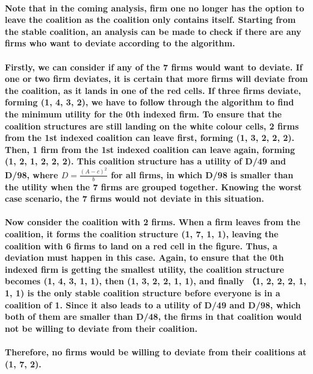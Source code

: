 \documentclass[11pt]{report}
\begin{document}
\paragraph{Note that in the coming analysis, firm one no longer has the option to leave the coalition as the coalition only contains itself. Starting from the stable coalition, an analysis can be made to check if there are any firms who want to deviate according to the algorithm.}

\paragraph{Firstly, we can consider if any of the 7 firms would want to deviate. If one or two firm deviates, it is certain that more firms will deviate from the coalition, as it lands in one of the red cells. If three firms deviate, forming (1, 4, 3, 2), we have to follow through the algorithm to find the minimum utility for the 0th indexed firm. To ensure that the coalition structures are still landing on the white colour cells, 2 firms from the 1st indexed coalition can leave first, forming (1, 3, 2, 2, 2). Then, 1 firm from the 1st indexed coalition can leave again, forming (1, 2, 1, 2, 2, 2). This coalition structure has a utility of D/49 and D/98, where $D=\frac{(A-c)^2}{b}$\cite{ray2007coalitionformation} for all firms, in which D/98 is smaller than the utility when the 7 firms are grouped together. Knowing the worst case scenario, the 7 firms would not deviate in this situation.}
\paragraph{Now consider the coalition with 2 firms. When a firm leaves from the coalition, it forms the coalition structure (1, 7, 1, 1), leaving the coalition with 6 firms to land on a red cell in the figure. Thus, a deviation must happen in this case. Again, to ensure that the 0th indexed firm is getting the smallest utility, the coalition structure becomes (1, 4, 3, 1, 1), then (1, 3, 2, 2, 1, 1), and finally （1, 2, 2, 2, 1, 1, 1) is the only stable coalition structure before everyone is in a coalition of 1. Since it also leads to a utility of D/49 and D/98, which both of them are smaller than D/48, the firms in that coalition would not be willing to deviate from their coalition. 
}
\paragraph{Therefore, no firms would be willing to deviate from their coalitions at (1, 7, 2). }
\end{document}
